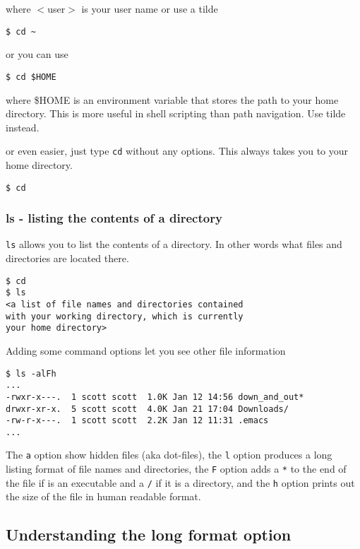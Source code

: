 \documentclass[12pt]{article}
\begin{document}
where $<$user$>$ is your user name or use a tilde

\begin{lstlisting}[style=bash]
$ cd ~
\end{lstlisting}

or you can use 
\begin{lstlisting}[style=bash]
$ cd $HOME
\end{lstlisting}

where \$HOME is an environment variable that stores the path to your
home directory. This is more useful in shell scripting than path
navigation. Use tilde instead.

or even easier, just type \texttt{cd} without any options. This always takes you to your home directory.

\begin{lstlisting}[style=bash]
$ cd 
\end{lstlisting}



\subsubsection{ls - listing the contents of a directory}
\texttt{ls} allows you to list the contents of a directory. In other
words what files and directories are located there.

\begin{lstlisting}[style=bash]
$ cd 
$ ls
<a list of file names and directories contained 
with your working directory, which is currently
your home directory>
\end{lstlisting}

Adding some command options let you see other file information

\begin{lstlisting}[style=bash]
$ ls -alFh 
...
-rwxr-x---.  1 scott scott  1.0K Jan 12 14:56 down_and_out*
drwxr-xr-x.  5 scott scott  4.0K Jan 21 17:04 Downloads/
-rw-r-x---.  1 scott scott  2.2K Jan 12 11:31 .emacs
...
 \end{lstlisting}


The \texttt{a} option show hidden files (aka dot-files), the
\texttt{l} option produces a long
listing format of file names and directories, the \texttt{F} option
adds a \texttt{*} to the end of the file if is an executable and a
\texttt{/} if it is a directory, and the \texttt{h} option prints out the size of the
file in human readable format.

\subsection*{Understanding the long format option}
\end{document}
